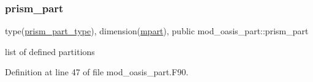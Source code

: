 \subsubsection{\texorpdfstring{prism\+\_\+part}{prism\_part}}
{\footnotesize\ttfamily type(\hyperlink{structmod__oasis__part_1_1prism__part__type}{prism\+\_\+part\+\_\+type}), dimension(\hyperlink{namespacemod__oasis__part_ab68d087792db0351181c9a97025d793b}{mpart}), public mod\+\_\+oasis\+\_\+part\+::prism\+\_\+part}



list of defined partitions 



Definition at line 47 of file mod\+\_\+oasis\+\_\+part.\+F90.

